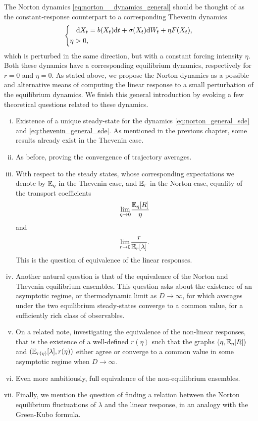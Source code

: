The Norton dynamics \eqref{eq:norton__dynamics_general} should be thought of as the constant-response counterpart to a corresponding Thevenin dynamics
\begin{equation}
        \label{eq:thevenin_general_sde}
    \left\{\begin{aligned}
        \mathrm{d} X_t &= b(X_t)\mathrm{d} t +\sigma(X_t)\mathrm{d} W_t + \eta F(X_t),\\
        \eta>0,
    \end{aligned}\right.
\end{equation}
which is perturbed in the same direction, but with a constant forcing intensity $\eta$. Both these dynamics have a corresponding equilibrium dynamics, respectively for $r=0$ and $\eta=0$. 
As stated above, we propose the Norton dynamics as a possible and alternative means of computing the linear response to a small perturbation of the equilibrium dynamics. 
We finish this general introduction by evoking a few theoretical questions related to these dynamics.
\begin{enumerate}[(i)]
    \item Existence of a unique steady-state for the dynamics \eqref{eq:norton_general_sde} and \eqref{eq:thevenin_general_sde}. As mentioned in the previous chapter, some results already exist in the Thevenin case.
    \item As before, proving the convergence of trajectory averages.
    \item With respect to the steady states, whose corresponding expectations we denote by $\mathbb{E}_\eta$ in the Thevenin case, and $\mathbb{E}_r$ in the Norton case, equality of the transport coefficients \[\underset{\eta \to 0}{\lim}\frac{\mathbb{E}_\eta[R]}{\eta}\] and \[\underset{r\to 0}{\lim}\frac{r}{\mathbb{E}_r[\lambda]}.\] This is the question of equivalence of the linear responses.
    \item Another natural question is that of the equivalence of the Norton and Thevenin equilibrium ensembles. This question asks about the existence of an asymptotic regime, or thermodynamic limit as $D\to\infty$, for which averages under the two equilibrium steady-states converge to a common value, for a sufficiently rich class of observables.
    \item On a related note, investigating the equivalence of the non-linear responses, that is the existence of a well-defined $r(\eta)$ such that the graphs $(\eta,\mathbb{E}_\eta[R])$ and $(\mathbb{E}_{r(\eta)}[\lambda],r(\eta))$ either agree or converge to a common value in some asymptotic regime when $D\to\infty$.
    \item Even more ambitiously, full equivalence of the non-equilibrium ensembles.
    \item Finally, we mention the question of finding a relation between the Norton equilibrium fluctuations of $\lambda$ and the linear response, in an analogy with the Green-Kubo formula.
\end{enumerate}
